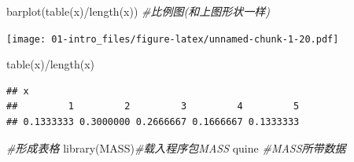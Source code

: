 \documentclass[
]{book}
\newenvironment{Shaded}{\begin{snugshade}}{\end{snugshade}}
\newcommand{\CommentTok}[1]{\textcolor[rgb]{0.56,0.35,0.01}{\textit{#1}}}
\newcommand{\FunctionTok}[1]{\textcolor[rgb]{0.00,0.00,0.00}{#1}}
\newcommand{\NormalTok}[1]{#1}
\newcommand{\SpecialCharTok}[1]{\textcolor[rgb]{0.00,0.00,0.00}{#1}}
\begin{document}
\begin{Shaded}
\begin{Highlighting}[]
\FunctionTok{barplot}\NormalTok{(}\FunctionTok{table}\NormalTok{(x)}\SpecialCharTok{/}\FunctionTok{length}\NormalTok{(x)) }\CommentTok{\#比例图(和上图形状一样)}
\end{Highlighting}
\end{Shaded}

\texttt{[image: 01-intro\_files/figure-latex/unnamed-chunk-1-20.pdf]}

\begin{Shaded}
\begin{Highlighting}[]
\FunctionTok{table}\NormalTok{(x)}\SpecialCharTok{/}\FunctionTok{length}\NormalTok{(x)}
\end{Highlighting}
\end{Shaded}

\begin{verbatim}
## x
##         1         2         3         4         5 
## 0.1333333 0.3000000 0.2666667 0.1666667 0.1333333
\end{verbatim}

\begin{Shaded}
\begin{Highlighting}[]
\CommentTok{\#形成表格}
\FunctionTok{library}\NormalTok{(MASS)}\CommentTok{\#载入程序包MASS}
\NormalTok{quine }\CommentTok{\#MASS所带数据}
\end{Highlighting}
\end{Shaded}
\end{document}
